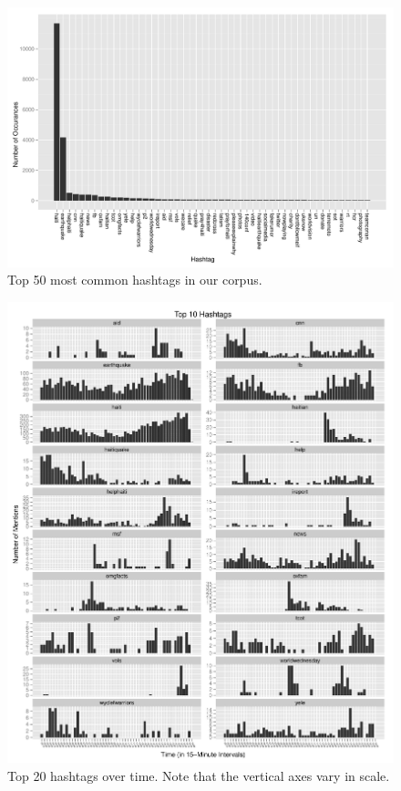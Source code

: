 \documentclass[a4paper, 11pt, titlepage]{article}
\begin{document}
\begin{figure}[h]
\centering
\includegraphics[width=\textwidth]{../figures/hashtag_counts.pdf}
\caption{Top 50 most common hashtags in our corpus.}
\label{fig:hashtag_counts}
\end{figure}


\begin{figure}[h]
\centering
\includegraphics[width=\textwidth]{../figures/top-20-hashtags.pdf}
\caption{Top 20 hashtags over time. Note that the vertical axes vary in scale.}
\label{fig:hashtag_counts}
\end{figure}
\end{document}
